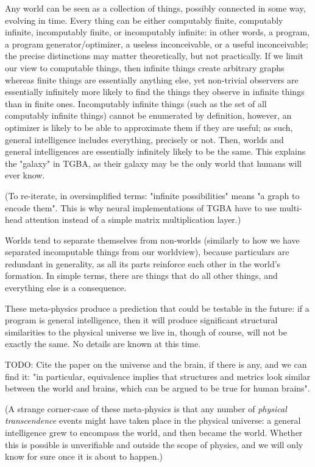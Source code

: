 \documentclass{article}
\begin{document}
Any world can be seen as a collection of things, possibly connected in some way, evolving in time. Every thing can be either computably finite, computably infinite, incomputably finite, or incomputably infinite: in other words, a program, a program generator/optimizer, a useless inconceivable, or a useful inconceivable; the precise distinctions may matter theoretically, but not practically. If we limit our view to computable things, then infinite things create arbitrary graphs whereas finite things are essentially anything else, yet non-trivial observers are essentially infinitely more likely to find the things they observe in infinite things than in finite ones. Incomputably infinite things (such as the set of all computably infinite things) cannot be enumerated by definition, however, an optimizer is likely to be able to approximate them if they are useful; as such, general intelligence includes everything, precisely or not. Then, worlds and general intelligences are essentially infinitely likely to be the same. This explains the "galaxy" in TGBA, as their galaxy may be the only world that humans will ever know.

(To re-iterate, in oversimplified terms: "infinite possibilities" means "a graph to encode them". This is why neural implementations of TGBA have to use multi-head attention instead of a simple matrix multiplication layer.)

Worlds tend to separate themselves from non-worlds (similarly to how we have separated incomputable things from our worldview), because particulars are redundant in generality, as all its parts reinforce each other in the world's formation. In simple terms, there are things that do all other things, and everything else is a consequence.

These meta-physics produce a prediction that could be testable in the future: if a program is general intelligence, then it will produce significant structural similarities to the physical universe we live in, though of course, will not be exactly the same. No details are known at this time.

    TODO: Cite the paper on the universe and the brain, if there is any, and we can find it: "in particular, equivalence implies that structures and metrics look similar between the world and brains, which can be argued to be true for human brains".

(A strange corner-case of these meta-physics is that any number of \textit{physical transcendence} events might have taken place in the physical universe: a general intelligence grew to encompass the world, and then became the world. Whether this is possible is unverifiable and outside the scope of physics, and we will only know for sure once it is about to happen.)
\end{document}
